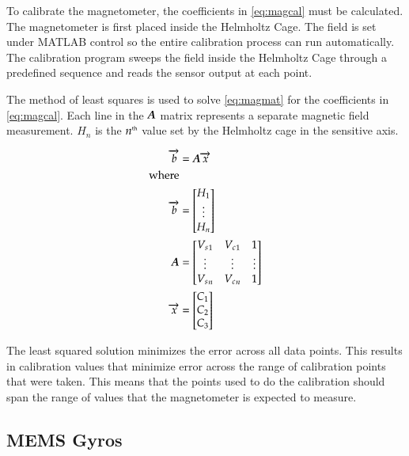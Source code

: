 To calibrate the magnetometer, the coefficients in \cref{eq:magcal} must be calculated. The magnetometer is first placed inside the Helmholtz Cage. The field is set under MATLAB control so the entire calibration process can run automatically. The calibration program sweeps the field inside the Helmholtz Cage through a predefined sequence and reads the sensor output at each point. 

The method of least squares is used to solve \cref{eq:magmat} for the coefficients in \cref{eq:magcal}. Each line in the $\boldsymbol{A}$ matrix represents a separate magnetic field measurement. $H_n$ is the $n^{\text{\tiny th}}$ value set by the Helmholtz cage in the sensitive axis. 

\begin{equation}
    \label{eq:magmat}
    \begin{split}
    \vect{b}&=\matt{A} \vect{x} \\
    {\text{\raggedright where}} \\
    \vect{b}&= 
    \begin{bmatrix}
        H_1 \\
        \vdots \\
        H_n \\
    \end{bmatrix} \\
    \matt{A}&=
    \begin{bmatrix}
        {V_s}_1 & {V_c}_1 & 1 \\
        \vdots & \vdots & \vdots\\
        {V_s}_n & {V_c}_n & 1 \\
    \end{bmatrix} \\
    \vect{x}&= 
    \begin{bmatrix}
        C_1 \\
        C_2 \\
        C_3 \\
    \end{bmatrix} 
    \end{split}
\end{equation}

The least squared solution minimizes the error across all data points. This results in calibration values that minimize error across the range of calibration points that were taken. This means that the points used to do the calibration should span the range of values that the magnetometer is expected to measure. 

\subsection{\acs{MEMS} Gyros}


